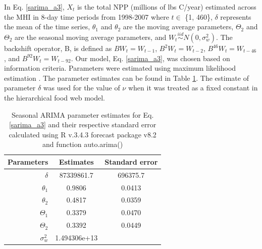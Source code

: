 \documentclass[oneside,12pt,final]{sty/ucthesis-CA2012}
\let\cite\citep                             %
\begin{document}
\begin{mainmatter}
In Eq. \ref{sarima_a3}, $X_t$ is the total NPP (millions of lbs C/year) estimated across the MHI in 8-day time periods from 1998-2007 where $t \in$ \{1, 460\}, $\delta$ represents the mean of the time series, $\theta_1$ and $\theta_2$ are the moving average parameters, $\Theta_2$ and $\Theta_2$ are the seasonal moving average parameters, and $W_t \stackrel{iid}{\sim} N(0,\sigma_w^2)$. The backshift operator, B, is defined as $ BW_t  = W_{t-1}$, $B^2W_t  = W_{t-2}$, $B^{46}W_t  = W_{t-46}$, and $B^{92}W_t  = W_{t-92}$.  Our model, Eq. \ref{sarima_a3}, was chosen based on information criteria. Parameters were estimated using maximum likelihood estimation \cite{forecast1, forecast2}. The parameter estimates can be found in Table \ref{sarima_parameters_a3}. The estimate of parameter $\delta$ was used for the value of $\nu$ when it was treated as a fixed constant in the hierarchical food web model.

\begin{table}[H]
\centering
\caption{Seasonal ARIMA parameter estimates for Eq. \ref{sarima_a3} and their respective standard error calculated using R v.3.4.3 \cite{Rcite} forecast package v8.2 and function auto.arima() \cite{forecast1, forecast2} }
\begin{tabular}{r|c|c}
  \hline \small
 Parameters & Estimates & Standard error \\ 
   \hline
   $\delta$ & 87339861.7 & 696375.7 \\   
   $\theta_1$ & 0.9806 & 0.0413 \\
   $\theta_2$ & 0.4817 & 0.0359 \\
   $\Theta_1$ & 0.3379 & 0.0470 \\
   $\Theta_2$ & 0.3392 & 0.0449 \\
   $\sigma_w^2$ & 1.494306e+13 & \\
   \hline
\end{tabular} 
\label{sarima_parameters_a3}
\end{table}


\end{mainmatter}
\end{document}
